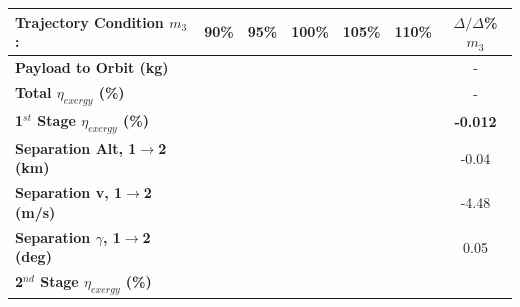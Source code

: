 \begin{table}[ht]%
	\centering
	\begin{tabular}{l c c c c c c} 
		\hline \textbf{Trajectory Condition}   \qquad  $m_{3}$:
		&90\%
		&95\%
		&100\%
		&105\%
		&110\%
		& $\Delta/\Delta$\%$m_{3}$
		\\
		\hline \textbf{Payload to Orbit (kg)}
		& \textbf{\PayloadToOrbitmThreeNinety}
		& \textbf{\PayloadToOrbitmThreeNinetyFive}
		& \textbf{\PayloadToOrbitmThreeStandard}
		& \textbf{\PayloadToOrbitmThreeOneHundredFive}
		& \textbf{\PayloadToOrbitmThreeOneHundredTen}
		& -
		\\
		\textbf{Total $\eta_{exergy}$ (\%)}
		& \textbf{\totalExergyEffmThreeNinety}
		& \textbf{\totalExergyEffmThreeNinetyFive}
		& \textbf{\totalExergyEffmThreeStandard}
		& \textbf{\totalExergyEffmThreeOneHundredFive}
		& \textbf{\totalExergyEffmThreeOneHundredTen}
		& -
		\\
		\hline 
		\textbf{1$^{st}$ Stage $\eta_{exergy}$ (\%)}
		& \textbf{\firstExergyEffmThreeNinety}
		& \textbf{\firstExergyEffmThreeNinetyFive}
		& \textbf{\firstExergyEffmThreeStandard}
		& \textbf{\firstExergyEffmThreeOneHundredFive}
		& \textbf{\firstExergyEffmThreeOneHundredTen}
		& \textbf{-0.012}
		\\
		\textbf{Separation Alt, 1$\rightarrow$2 (km)}
		& \firstsecondSeparationAltmThreeNinety
		& \firstsecondSeparationAltmThreeNinetyFive
		& \firstsecondSeparationAltmThreeStandard
		& \firstsecondSeparationAltmThreeOneHundredFive
		& \firstsecondSeparationAltmThreeOneHundredTen
		&-0.04
		\\
		\textbf{Separation v, 1$\rightarrow$2 (m/s)}
		& \firstsecondSeparationvmThreeNinety
		& \firstsecondSeparationvmThreeNinetyFive
		& \firstsecondSeparationvmThreeStandard
		& \firstsecondSeparationvmThreeOneHundredFive
		& \firstsecondSeparationvmThreeOneHundredTen
		&-4.48
		\\
		\textbf{Separation $\gamma$, 1$\rightarrow$2 (deg)}
		& \firstsecondSeparationgammamThreeNinety
		& \firstsecondSeparationgammamThreeNinetyFive
		& \firstsecondSeparationgammamThreeStandard
		& \firstsecondSeparationgammamThreeOneHundredFive
		& \firstsecondSeparationgammamThreeOneHundredTen
		&0.05
		\\
		\hline 
		\textbf{2$^{nd}$ Stage $\eta_{exergy}$ (\%)}
		& \textbf{\secondExergyEffmThreeNinety}
		& \textbf{\secondExergyEffmThreeNinetyFive}
		& \textbf{\secondExergyEffmThreeStandard}
		& \textbf{\secondExergyEffmThreeOneHundredFive}
		& \textbf{\secondExergyEffmThreeOneHundredTen}

\end{tabular}
\end{table}
